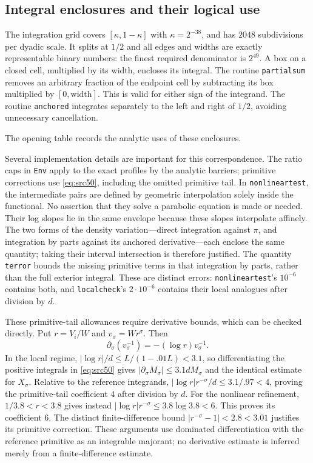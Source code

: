 \documentclass[11pt,a4paper]{article}
\numberwithin{equation}{section}
\theoremstyle{definition}
\theoremstyle{remark}
\begin{document}
\subsection{Integral enclosures and their logical use}\label{cert:integrals}

The integration grid covers $[\kappa,1-\kappa]$ with $\kappa=2^{-38}$,
and has $2048$ subdivisions per dyadic scale.  It splits at $1/2$ and all
edges and widths are exactly representable binary numbers: the finest
required denominator is $2^{49}$.  A box on a closed cell, multiplied by
its width, encloses its integral.  The routine \texttt{partialsum} removes
an arbitrary fraction of the endpoint cell by subtracting its box multiplied
by $[0,\text{width}]$.  This is valid for either sign of the integrand.
The routine \texttt{anchored} integrates separately to the left and right
of $1/2$, avoiding unnecessary cancellation.

The opening table records the analytic uses of these enclosures.

Several implementation details are important for this correspondence.
The ratio caps in \texttt{Env} apply to the exact profiles by the analytic
barriers; primitive corrections use \eqref{eq:src50}, including the omitted
primitive tail.  In \texttt{nonlineartest}, the intermediate pairs are defined
by geometric interpolation solely inside the functional.  No assertion that
they solve a parabolic equation is made or needed.  Their log slopes lie in
the same envelope because these slopes interpolate affinely.  The two forms
of the density variation---direct integration against $\pi$, and integration
by parts against its anchored derivative---each enclose the same quantity;
taking their interval intersection is therefore justified.  The quantity
\texttt{terror} bounds the missing primitive terms in that integration by
parts, rather than the full exterior integral.  These are distinct errors:
\texttt{nonlineartest}'s $10^{-6}$ contains both, and
\texttt{localcheck}'s $2\cdot10^{-6}$ contains their local analogues after
division by $d$.

These primitive-tail allowances require derivative bounds, which can be
checked directly.  Put $r=V_i/W$ and $v_\sigma=Wr^\sigma$.  Then
\[
 \partial_\sigma(v_\sigma^{-1})
       =-(\log r)v_\sigma^{-1}.
\]
In the local regime, $|\log r|/d\le L/(1-.01L)<3.1$, so differentiating
the positive integrals in \eqref{eq:src50} gives
$|\partial_\sigma M_\sigma|\le3.1dM_\sigma$ and the identical estimate
for $X_\sigma$.  Relative to the reference integrands,
$|\log r|r^{-\sigma}/d\le3.1/.97<4$, proving the primitive-tail
coefficient $4$ after division by $d$.  For the nonlinear refinement,
$1/3.8<r<3.8$ gives instead
$|\log r|r^{-\sigma}\le3.8\log3.8<6$.  This proves its coefficient $6$.
The distinct finite-difference bound
$|r^{-\sigma}-1|<2.8<3.01$ justifies its primitive correction.  These
arguments use dominated differentiation with the reference primitive as an
integrable majorant; no derivative estimate is inferred merely from a
finite-difference estimate.
\end{document}
